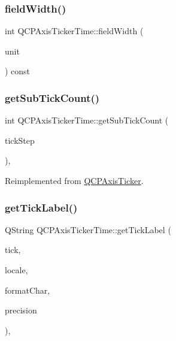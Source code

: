 \subsubsection{\texorpdfstring{field\+Width()}{fieldWidth()}}
{\footnotesize\ttfamily int Q\+C\+P\+Axis\+Ticker\+Time\+::field\+Width (\begin{DoxyParamCaption}\item[{\hyperlink{class_q_c_p_axis_ticker_time_a5c48ded8c6d3a1aca9b68219469fea3e}{Time\+Unit}}]{unit }\end{DoxyParamCaption}) const\hspace{0.3cm}{\ttfamily [inline]}}

\mbox{\label{class_q_c_p_axis_ticker_time_acace84c46598176aa53837e147595471}} 
\subsubsection{\texorpdfstring{get\+Sub\+Tick\+Count()}{getSubTickCount()}}
{\footnotesize\ttfamily int Q\+C\+P\+Axis\+Ticker\+Time\+::get\+Sub\+Tick\+Count (\begin{DoxyParamCaption}\item[{double}]{tick\+Step }\end{DoxyParamCaption})\hspace{0.3cm}{\ttfamily [protected]}, {\ttfamily [virtual]}}



Reimplemented from \hyperlink{class_q_c_p_axis_ticker_a4ccc403ced7a1457ce6ba293509933c8}{Q\+C\+P\+Axis\+Ticker}.

\mbox{\label{class_q_c_p_axis_ticker_time_a046eb771bdf2a959f570db542b3a0be6}} 
\subsubsection{\texorpdfstring{get\+Tick\+Label()}{getTickLabel()}}
{\footnotesize\ttfamily Q\+String Q\+C\+P\+Axis\+Ticker\+Time\+::get\+Tick\+Label (\begin{DoxyParamCaption}\item[{double}]{tick,  }\item[{const Q\+Locale \&}]{locale,  }\item[{Q\+Char}]{format\+Char,  }\item[{int}]{precision }\end{DoxyParamCaption})\hspace{0.3cm}{\ttfamily [protected]}, {\ttfamily [virtual]}}




